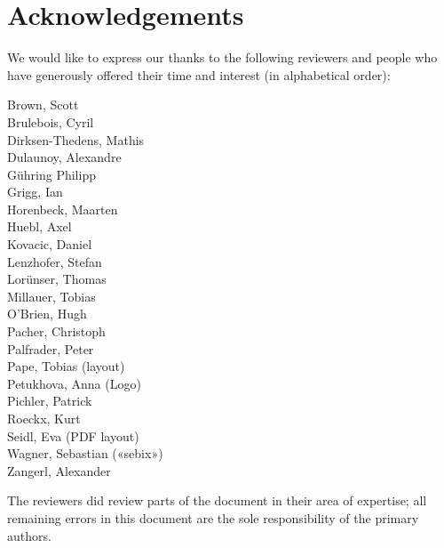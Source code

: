 \newpage
\section*{Acknowledgements}
\label{section:Reviewers}

We would like to express our thanks to the following reviewers and people who have generously offered their time and interest (in alphabetical order):

\begin{multicols}{2}{\parskip=0pt\centering\obeylines%
Brown, Scott \\
Brulebois, Cyril \\
Dirksen-Thedens, Mathis \\
Dulaunoy, Alexandre \\
Gühring Philipp  \\
Grigg, Ian  \\
Horenbeck, Maarten \\
Huebl, Axel \\
Kovacic, Daniel \\
Lenzhofer, Stefan \\
Lorünser, Thomas \\
Millauer, Tobias \\
O'Brien, Hugh \\
Pacher, Christoph \\
Palfrader, Peter \\
Pape, Tobias (layout) \\
Petukhova, Anna (Logo) \\
Pichler, Patrick \\
Roeckx, Kurt \\
Seidl, Eva (PDF layout) \\
Wagner, Sebastian («sebix») \\
Zangerl, Alexander \\
}\end{multicols}





The reviewers did review parts of the document in their area of
expertise; all remaining errors in this document are the sole
responsibility of the primary authors.





